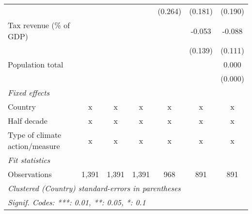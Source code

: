 \begin{tabular}{lcccccc}
                                                  &               &               &                & (0.264)        & (0.181)       & (0.190)\\   
   Tax revenue (\% of GDP)                        &               &               &                &                & -0.053        & -0.088\\   
                                                  &               &               &                &                & (0.139)       & (0.111)\\   
   Population total                               &               &               &                &                &               & 0.000\\   
                                                  &               &               &                &                &               & (0.000)\\   
   \emph{Fixed effects}\\
   Country                                        & x             & x             & x              & x              & x             & x\\  
   Half decade                                    & x             & x             & x              & x              & x             & x\\  
   Type of climate action/measure                 & x             & x             & x              & x              & x             & x\\  
   \midrule \emph{Fit statistics}\\
   Observations                                   & 1,391         & 1,391         & 1,391          & 968            & 891           & 891\\  
   \midrule
   \multicolumn{7}{l}{\emph{Clustered (Country) standard-errors in parentheses}}\\
   \multicolumn{7}{l}{\emph{Signif. Codes: ***: 0.01, **: 0.05, *: 0.1}}\\
\end{tabular}
\par\endgroup


